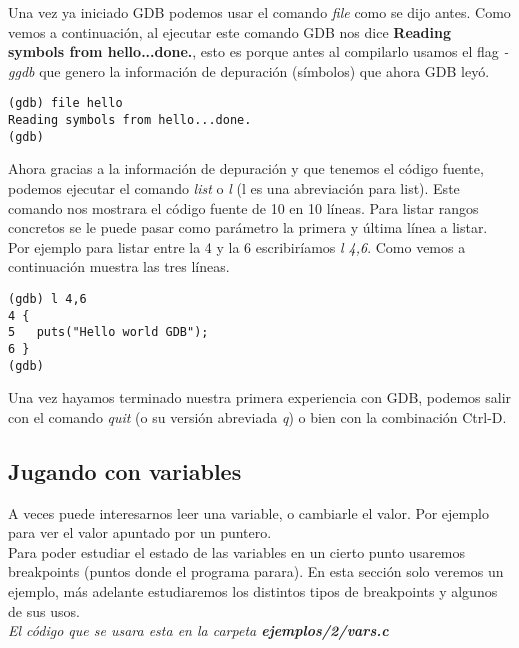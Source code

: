 Una vez ya iniciado GDB podemos usar el comando \emph{file} como se dijo antes. Como vemos a continuación, al ejecutar este comando GDB nos dice \textbf{Reading symbols from hello...done.}, esto es porque antes al compilarlo usamos el flag \emph{-ggdb} que genero la información de depuración (símbolos) que ahora GDB leyó. 
\begin{verbatim} 
(gdb) file hello
Reading symbols from hello...done.
(gdb)
\end{verbatim}
Ahora gracias a la información de depuración y que tenemos el código fuente, podemos ejecutar el comando \emph{list} o \emph{l} (l es una abreviación para list). Este comando nos mostrara el código fuente de 10 en 10 líneas. Para listar rangos concretos se le puede pasar como parámetro la primera y última línea a listar. Por ejemplo para listar entre la 4 y la 6 escribiríamos \emph{l 4,6}. Como vemos a continuación muestra las tres líneas.
\begin{verbatim}
(gdb) l 4,6
4 {
5   puts("Hello world GDB");
6 }
(gdb)
\end{verbatim}
Una vez hayamos terminado nuestra primera experiencia con GDB, podemos salir con el comando \emph{quit} (o su versión abreviada \emph{q}) o bien con la combinación Ctrl-D.

\subsection{Jugando con variables}
A veces puede interesarnos leer una variable, o cambiarle el valor. Por ejemplo para ver el valor apuntado por un puntero. \\Para poder estudiar el estado de las variables en un cierto punto usaremos breakpoints (puntos donde el programa parara). En esta sección solo veremos un ejemplo, más adelante estudiaremos los distintos tipos de breakpoints y algunos de sus usos. \\

\emph{El código que se usara esta en la carpeta \textbf{ejemplos/2/vars.c}}\\

